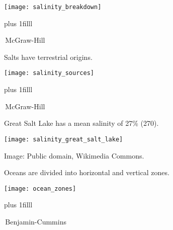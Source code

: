 \documentclass[t]{beamer}
\begin{document}


\begin{frame}[t]%
	\begin{center}
	\texttt{[image: salinity\_breakdown]}
	\end{center}

\vskip0pt plus 1filll

\tiny \textcopyright\,McGraw-Hill
\end{frame}


\begin{frame}[t]{Salts have terrestrial origins.}
	\begin{center}
	\texttt{[image: salinity\_sources]}
	\end{center}

\vskip0pt plus 1filll

\tiny \textcopyright\,McGraw-Hill
\end{frame}

\begin{frame}[t]{Great Salt Lake has a mean salinity of 27\% (270\text{\textperthousand}).}
	\begin{center}
		\texttt{[image: salinity\_great\_salt\_lake]}
	\end{center}

	\tiny Image: Public domain, Wikimedia Commons.
\end{frame}

\begin{frame}[t]{Oceans are divided into horizontal and vertical zones.}
	\begin{center}
	\texttt{[image: ocean\_zones]}
	\end{center}

\vskip0pt plus 1filll

\tiny \textcopyright\,Benjamin-Cummins
\end{frame}
\end{document}
